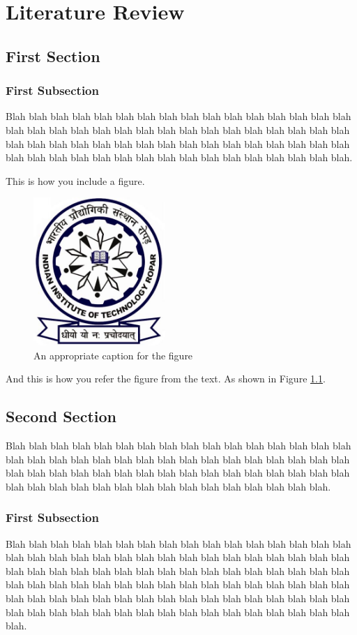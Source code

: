 \chapter{Literature Review}
\section{First Section}
\subsection{First Subsection}
Blah blah blah blah blah blah blah blah blah blah blah blah blah blah blah blah blah blah blah blah blah blah blah blah blah blah blah blah blah blah blah blah blah blah blah blah blah blah blah blah blah blah blah blah blah blah blah blah blah blah blah blah blah blah blah blah blah blah blah blah blah blah blah blah.

This is how you include a figure.

\begin{figure}
\caption{An appropriate caption for the figure}
\label{fig:labelforfigure}
\centering \includegraphics[width=5cm]{figures/IITRopar-Logo.jpg}
\end{figure}

And this is how you refer the figure from the text. As shown in Figure \ref{fig:labelforfigure}.

\section{Second Section}
Blah blah blah blah blah blah blah blah blah blah blah blah blah blah blah blah blah blah blah blah blah blah blah blah blah blah blah blah blah blah blah blah blah blah blah blah blah blah blah blah blah blah blah blah blah blah blah blah blah blah blah blah blah blah blah blah blah blah blah blah blah blah blah.
\subsection{First Subsection}
Blah blah blah blah blah blah blah blah blah blah blah blah blah blah blah blah blah blah blah blah blah blah blah blah blah blah blah blah blah blah blah blah blah blah blah blah blah blah blah blah blah blah blah blah blah blah blah blah blah blah blah blah blah blah blah blah blah blah blah blah blah blah blah blah blah blah blah blah blah blah blah blah blah blah blah blah blah blah blah blah blah blah blah blah blah blah blah blah blah blah blah blah blah blah blah blah blah.

